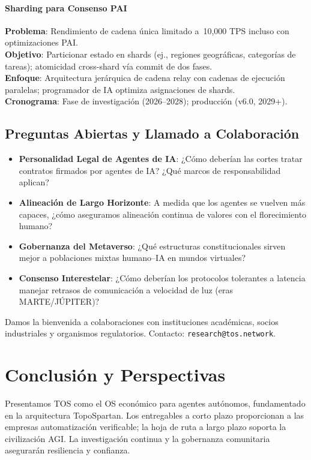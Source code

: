 \documentclass[11pt]{article}
\begin{document}
\paragraph{Sharding para Consenso PAI}
\textbf{Problema}: Rendimiento de cadena única limitado a~10,000 TPS incluso con optimizaciones PAI.\\
\textbf{Objetivo}: Particionar estado en shards (ej., regiones geográficas, categorías de tareas); atomicidad cross-shard vía commit de dos fases.\\
\textbf{Enfoque}: Arquitectura jerárquica de cadena relay con cadenas de ejecución paralelas; programador de IA optimiza asignaciones de shards.\\
\textbf{Cronograma}: Fase de investigación (2026--2028); producción (v6.0, 2029+).

\subsection{Preguntas Abiertas y Llamado a Colaboración}

\begin{itemize}[noitemsep]
  \item \textbf{Personalidad Legal de Agentes de IA}: ¿Cómo deberían las cortes tratar contratos firmados por agentes de IA? ¿Qué marcos de responsabilidad aplican?
  \item \textbf{Alineación de Largo Horizonte}: A medida que los agentes se vuelven más capaces, ¿cómo aseguramos alineación continua de valores con el florecimiento humano?
  \item \textbf{Gobernanza del Metaverso}: ¿Qué estructuras constitucionales sirven mejor a poblaciones mixtas humano--IA en mundos virtuales?
  \item \textbf{Consenso Interestelar}: ¿Cómo deberían los protocolos tolerantes a latencia manejar retrasos de comunicación a velocidad de luz (eras MARTE/JÚPITER)?
\end{itemize}

Damos la bienvenida a colaboraciones con instituciones académicas, socios industriales y organismos regulatorios. Contacto: \texttt{research@tos.network}.

\section{Conclusión y Perspectivas}
Presentamos TOS como el OS económico para agentes autónomos, fundamentado en la arquitectura TopoSpartan. Los entregables a corto plazo proporcionan a las empresas automatización verificable; la hoja de ruta a largo plazo soporta la civilización AGI. La investigación continua y la gobernanza comunitaria asegurarán resiliencia y confianza.
\end{document}
